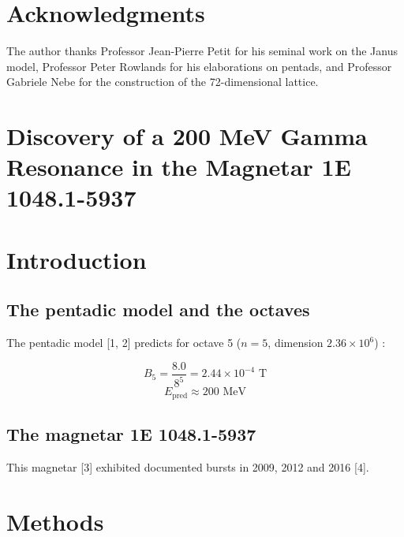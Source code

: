\documentclass[11pt]{article}
\begin{document}
\hypertarget{acknowledgments-1}{%
\section{Acknowledgments}\label{acknowledgments-1}}

The author thanks Professor Jean-Pierre Petit for his seminal work on
the Janus model, Professor Peter Rowlands for his elaborations on
pentads, and Professor Gabriele Nebe for the construction of the
72-dimensional lattice.

\clearpage
{}

\hypertarget{discovery-of-a-200-mev-gamma-resonance-in-the-magnetar-1e-1048.1-5937}{%
\section{Discovery of a 200 MeV Gamma Resonance in the Magnetar 1E
1048.1-5937}\label{discovery-of-a-200-mev-gamma-resonance-in-the-magnetar-1e-1048.1-5937}}

\hypertarget{introduction-2}{%
\section{Introduction}\label{introduction-2}}

\hypertarget{the-pentadic-model-and-the-octaves}{%
\subsection{The pentadic model and the
octaves}\label{the-pentadic-model-and-the-octaves}}

The pentadic model {[}1, 2{]} predicts for octave 5 (\(n=5\), dimension
\(2.36 \times 10^6\)) :

\[B_5 = \frac{8.0}{8^5} = 2.44 \times 10^{-4} \text{ T}\]
\[E_{\text{pred}} \approx 200 \text{ MeV}\]

\hypertarget{the-magnetar-1e-1048.1-5937}{%
\subsection{The magnetar 1E
1048.1-5937}\label{the-magnetar-1e-1048.1-5937}}

This magnetar {[}3{]} exhibited documented bursts in 2009, 2012 and 2016
{[}4{]}.

\hypertarget{methods}{%
\section{Methods}\label{methods}}
\end{document}

